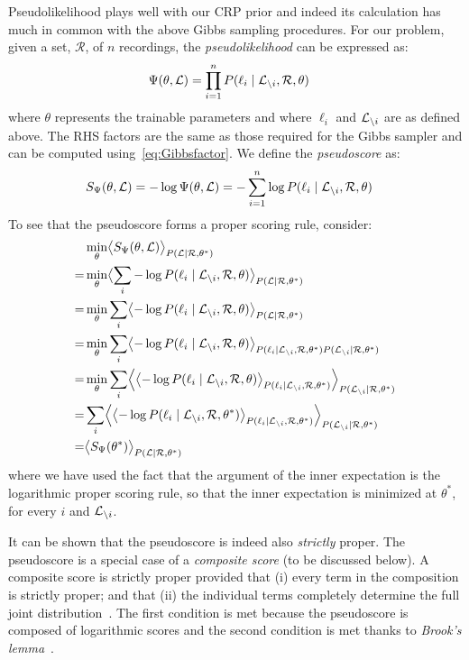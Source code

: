 \documentclass[a4paper,oneside,12pt,english]{report}
\def\expv#1#2{\bigl\langle#1\bigr\rangle_{#2}}
\def\Expv#1#2{\Bigl\langle#1\Bigr\rangle_{#2}}
\def\Lset{\mathcal{L}}
\def\Rset{\mathcal{R}}
\begin{document}
Pseudolikelihood plays well with our CRP prior and indeed its calculation has much in common with the above Gibbs sampling procedures. For our problem, given a set, $\Rset$, of $n$ recordings, the \emph{pseudolikelihood} can be expressed as:
\begin{align}
\label{eq:Psi}
\Psi(\theta,\Lset) &= \prod_{i=1}^n P(\ell_i\mid \Li, \Rset,\theta)
\end{align} 
where $\theta$ represents the trainable parameters and where $\ell_i$ and $\Li$ are as defined above. The RHS factors are the same as those required for the Gibbs sampler and can be computed using~\eqref{eq:Gibbsfactor}. We define the \emph{pseudoscore} as:
\begin{align}
S_\Psi(\theta,\Lset) &= -\log \Psi(\theta,\Lset) = -\sum_{i=1}^n \log P(\ell_i\mid \Li, \Rset,\theta)
\end{align} 
To see that the pseudoscore forms a proper scoring rule, consider:
\begin{align}
\begin{split}
&\min_\theta\expv{S_\Psi(\theta,\Lset)}{P(\Lset\mid\Rset,\theta^*)}\\
=& \min_\theta\expv{\sum_i-\log P(\ell_i\mid \Li, \Rset,\theta)}{P(\Lset\mid\Rset,\theta^*)}\\
=& \min_\theta\sum_i\expv{-\log P(\ell_i\mid \Li, \Rset,\theta)}{P(\Lset\mid\Rset,\theta^*)}\\
=& \min_\theta\sum_i\expv{-\log P(\ell_i\mid \Li, \Rset,\theta)}{P(\ell_i\mid \Li, \Rset,\theta^*)P(\Li\mid\Rset,\theta^*)}\\
=& \min_\theta\sum_i\Expv{\expv{-\log P(\ell_i\mid \Li, \Rset,\theta)}{P(\ell_i\mid \Li, \Rset,\theta^*)}}{P(\Li\mid\Rset,\theta^*)}\\
=& \sum_i\Expv{\expv{-\log P(\ell_i\mid \Li, \Rset,\theta^*)}{P(\ell_i\mid \Li, \Rset,\theta^*)}}{P(\Li\mid\Rset,\theta^*)}\\
=& \expv{S_\Psi(\theta^*)}{P(\Lset\mid\Rset,\theta^*)}
\end{split}
\end{align}
where we have used the fact that the argument of the inner expectation is the logarithmic proper scoring rule, so that the inner expectation is minimized at $\theta^*$, for every $i$ and $\Li$. 

It can be shown that the pseudoscore is indeed also \emph{strictly} proper. The pseudoscore is a special case of a \emph{composite score} (to be discussed below). A composite score is strictly proper provided that (i) every term in the composition is strictly proper; and that (ii) the individual terms completely determine the full joint distribution~\cite{Dawid_Musio_ThApp_PSR_2014}. The first condition is met because the pseudoscore is composed of logarithmic scores and the second condition is met thanks to \emph{Brook's lemma}~\cite{Lyu_BrooksLemma,BrooksLemma}.
\end{document}

